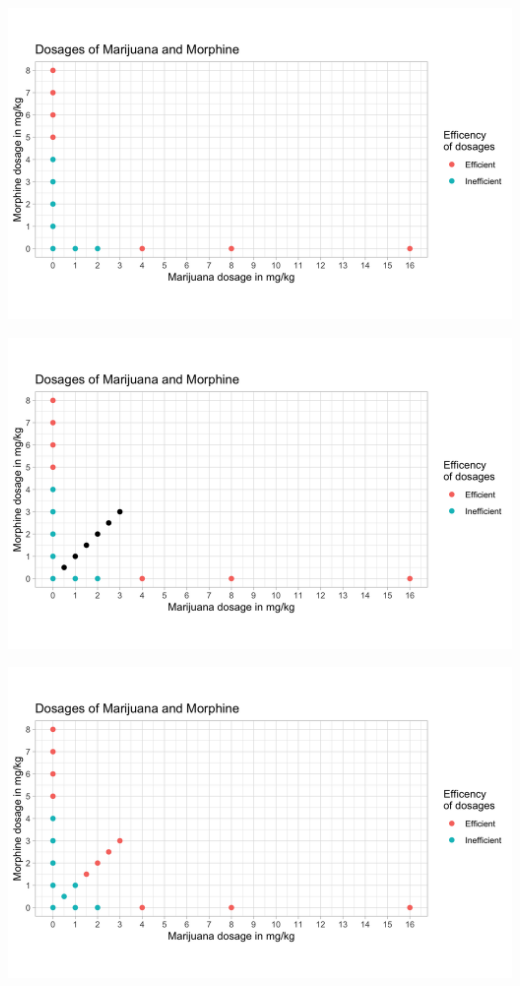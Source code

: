 \documentclass[14pt]{beamer}
\begin{document}
\begin{frame}
\begin{center}
\includegraphics[scale=0.24]{img5.png}
\end{center}
\end{frame}

\begin{frame}
\begin{center}
\includegraphics[scale=0.24]{img6.png}
\end{center}
\end{frame}

\begin{frame}
\begin{center}
\includegraphics[scale=0.24]{img7.png}
\end{center}
\end{frame}
\end{document}
